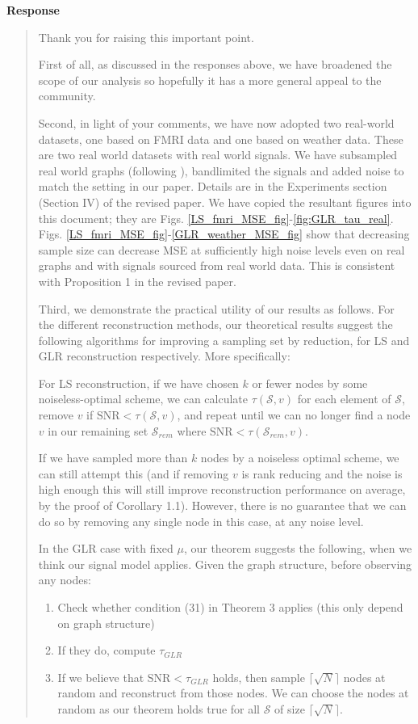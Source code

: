 \documentclass[11pt,onecolumn,journal]{IEEEtran}
\theoremstyle{definition}
\newcommand{\set}[1]{\mathcal{#1}}
\begin{document}
\textbf{Response}
\begin{quote}
Thank you for raising this important point. 

First of all, as discussed in the responses above, we have broadened the scope of our analysis so hopefully it has a more general appeal to the community.

Second, in light of your comments, we have now adopted two real-world datasets, one based on FMRI data and one based on weather data. These are two real world datasets with real world signals. We have subsampled real world graphs (following \cite{zhi2023gaussian}), bandlimited the signals and added noise to match the setting in our paper. Details are in the Experiments section (Section IV) of the revised paper. We have copied the resultant figures into this document; they are Figs. \ref{LS_fmri_MSE_fig}-\ref{fig:GLR_tau_real}. 
Figs. \ref{LS_fmri_MSE_fig}-\ref{GLR_weather_MSE_fig} show that decreasing sample size can decrease MSE at sufficiently high noise levels even on real graphs and with signals sourced from real world data. This is consistent with Proposition 1 in the revised paper.

Third, we demonstrate the practical utility of our results as follows. For the different reconstruction methods, our theoretical results suggest the following algorithms for improving a sampling set by reduction, for LS and GLR reconstruction respectively. More specifically:

    For LS reconstruction, if we have chosen $k$ or fewer nodes by some noiseless-optimal scheme, we can calculate $\tau(\set{S},v)$ for each element of $\set{S}$, remove $v$ if $\text{SNR} < \tau(\set{S},v)$, and repeat until we can no longer find a node $v$ in our remaining set $\set{S}_{rem}$ where $\text{SNR} < \tau(\set{S}_{rem},v)$.

    If we have sampled more than $k$ nodes by a noiseless optimal scheme, we can still attempt this (and if removing $v$ is rank reducing and the noise is high enough this will still improve reconstruction performance on average, by the proof of Corollary 1.1). However, there is no guarantee that we can do so by removing any single node in this case, at any noise level.

    In the GLR case with fixed $\mu$, our theorem suggests the following, when we think our signal model applies. Given the graph structure, before observing any nodes:
\begin{enumerate}
    \item Check whether  condition (31) in Theorem 3 applies (this only depend on graph structure)
    \item If they do, compute $\tau_{GLR}$
    \item If we believe that $\text{SNR} < \tau_{GLR}$ holds, then sample $\lceil\sqrt{N}\rceil$ nodes at random and reconstruct from those nodes. We can choose the nodes at random as our theorem holds true for all $\set{S}$ of size $\lceil\sqrt{N}\rceil$.
\end{enumerate}



\end{quote}
\end{document}
